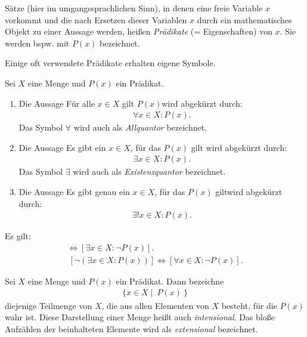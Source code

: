 \begin{mydef}
Sätze (hier im umgangssprachlichen Sinn), in denen eine freie Variable $x$
vorkommt und die nach Ersetzen dieser Variablen $x$ durch ein mathematisches
Objekt zu einer Aussage werden, heißen \textit{Prädikate} (= Eigenschaften)
von $x$.
Sie werden bspw. mit $P(x)$ bezeichnet.
\end{mydef}

Einige oft verwendete Prädikate erhalten eigene Symbole.

\begin{mydef}
Sei $X$ eine Menge und $P(x)$ ein Prädikat.
    \begin{enumerate}
        \item
        Die Aussage \glqq Für alle $x \in X$ gilt $P(x)$\grqq  wird abgekürzt durch:
        \begin{align*}
            \forall x \in X : P(x).
        \end{align*}
        Das Symbol $\forall$ wird auch als \textit{Allquantor} bezeichnet.
        \item
        Die Aussage \glqq Es gibt ein $x \in X$, für das $P(x)$ gilt \grqq  wird abgekürzt durch:
        \begin{align*}
            \exists x \in X : P(x).
        \end{align*}
        Das Symbol $\exists$ wird auch als \textit{Existenzquantor} bezeichnet.
        \item
        Die Aussage \glqq Es gibt genau ein $x \in X$, für das $P(x)$ gilt\grqq wird abgekürzt durch:
        \begin{align*}
            \exists ! x \in X : P(x).
        \end{align*}
    \end{enumerate}
\end{mydef}

\begin{remark}
Es gilt:
\begin{align*}
  [ \neg (\forall x \in X: P(x))] \iff [\exists x \in X: \neg P(x)]. \\\
  [ \neg (\exists x \in X: P(x))] \iff [\forall x \in X: \neg P(x)].
\end{align*}
\end{remark}

\begin{mydef}
Sei $X$ eine Menge und $P(x)$ ein Prädikat.
Dann bezeichne
\begin{align*}
    \{ x \in X \mid \ P(x) \ \}
\end{align*}
diejenige Teilmenge von $X$, die aus allen Elementen von $X$ besteht,
für die $P(x)$ wahr ist.
Diese Darstellung einer Menge heißt auch \textit{intensional}.
Das bloße Aufzählen der beinhalteten Elemente wird als \textit{extensional}
bezeichnet.
\end{mydef}

